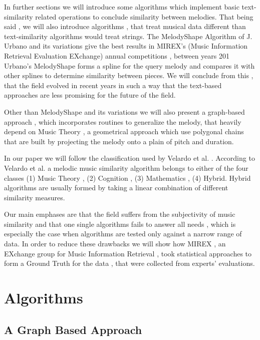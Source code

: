 \documentclass{llncs}
\begin{document}
		In further sections we will introduce some algorithms which implement basic text-similarity related operations to conclude similarity between melodies. That being said , we will also introduce  algorithms , that treat musical data different than text-similarity algorithms would treat  strings. The MelodyShape Algorithm of J. Urbano \cite{five_point_two}  and its variations give the best results in MIREX's (Music Information Retrieval Evaluation EXchange) annual competitions , between years 201
		Urbano's MelodyShape forms a spline for the query melody and compares it with other splines to determine similarity between pieces. We will conclude from this , that the field evolved in recent years in such a way that the text-based approaches are less promising for the future of the field.

		Other than MelodyShape and its variations we will also present a graph-based approach \cite{two_point_four} , which incorporates routines to generalize the melody, that heavily depend on Music Theory , a geometrical approach which use polygonal chains that are built by projecting the melody onto a plain of pitch and duration.

		In our paper we will follow the classification used by Velardo et al. \cite{two}. According to Velardo et al. a melodic music similarity algorithm belongs to either of the four classes (1) Music Theory , (2) Cognition , (3) Mathematics , (4) Hybrid. Hybrid algorithms are usually formed by taking a linear combination of different similarity measures. 

		Our main emphases are that the field suffers from the subjectivity of music similarity and that one single algorithms fails to answer all needs , which is especially the case when algorithms are tested only against a narrow range of data. In order to reduce these drawbacks we will show how MIREX , an EXchange group for Music Information Retrieval , took statistical approaches to form a Ground Truth for the data , that were collected from experts' evaluations. 
	
	\section{Algorithms}

		\subsection{A Graph Based Approach}
\end{document}
